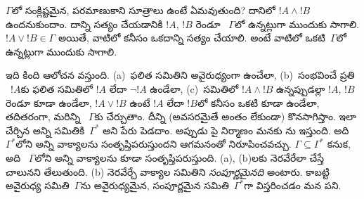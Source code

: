 \documentclass[../../../include/open-logic-section]{subfiles}
\begin{document}
$\Gamma$లో సంక్లిష్టమైన, పరమాణుకాని సూత్రాలు ఉంటే ఏమవుతుంది? దానిలో
$!A \land !B$ ఉందనుకుందాం. దాన్ని సత్యం చేయడానికి $!A$, $!B$ రెండూ
~$\Gamma$లో ఉన్నట్లుగా ముందుకు సాగాలి. $!A \lor !B \in \Gamma$ అయితే,
వాటిలో కనీసం ఒకదాన్ని సత్యం చేయాలి. అంటే వాటిలో ఒకటి~$\Gamma$లో
ఉన్నట్లుగా ముందుకు సాగాలి.

ఇది కింది ఆలోచన వస్తుంది. (a)~ఫలిత సమితిని అవైరుధ్యంగా ఉంచేలా,
(b)~సంభవించే ప్రతి ~$!A$కు ఫలిత సమితిలో $!A$ లేదా
$\lnot !A$ ఉండేలా, (c)~సమితిలో $!A \land !B$ ఉన్నప్పుడల్లా $!A$,
$!B$ రెండూ కూడా ఉండేలా, $!A \lor !B$ ఉంటే $!A$ లేదా $!B$లో కనీసం
ఒకటి కూడా ఉండేలా, తదితరంగా, మరిన్ని ~$\Gamma$కు
చేర్చుతాం.
దీన్ని (అవసరమైతే అంతం లేకుండా) కొనసాగిస్తాం. ఇలా చేర్చిన అన్ని
 సమితికి~$\Gamma^*$ అని పేరు పెడదాం. అప్పుడు పై నిర్మాణం మనకు
ను
ఇస్తుంది. అది~$\Gamma^*$లోని అన్ని వాక్యాలను సంతృప్తిపరుస్తుందని
ఆగమనంతో నిరూపించవచ్చు. $\Gamma \subseteq \Gamma^*$ కనుక, అది
~$\Gamma$లోని అన్ని వాక్యాలను కూడా సంతృప్తిపరుస్తుంది. (a), (b)లకు
నెరవేరేలా చేస్తే చాలునని తేలుతుంది. (b) నెరవేర్చే వాక్యాల సమితిని
\emph{సంపూర్ణమైనది} అంటారు. కాబట్టి అవైరుధ్య సమితి~$\Gamma$ను
అవైరుధ్యమైన, సంపూర్ణమైన సమితి~$\Gamma^*$గా విస్తరించడం మన పని.
\end{document}
